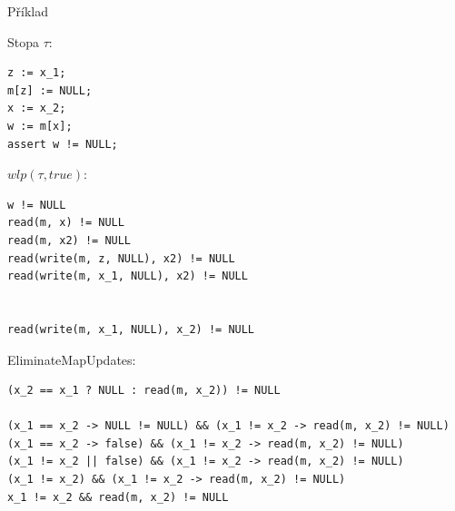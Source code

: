 \documentclass[11pt]{beamer}
\begin{document}
\begin{frame}[fragile]{Příklad}

Stopa $\tau$:
\begin{lstlisting}
z := x_1;
m[z] := NULL;
x := x_2;
w := m[x];
assert w != NULL;
\end{lstlisting}

\pause

$wlp(\tau, true)$:
\begin{lstlisting}
w != NULL
read(m, x) != NULL
read(m, x2) != NULL
read(write(m, z, NULL), x2) != NULL
read(write(m, x_1, NULL), x2) != NULL


read(write(m, x_1, NULL), x_2) != NULL
\end{lstlisting}

\pause 

EliminateMapUpdates:
\begin{lstlisting}
(x_2 == x_1 ? NULL : read(m, x_2)) != NULL

(x_1 == x_2 -> NULL != NULL) && (x_1 != x_2 -> read(m, x_2) != NULL)
(x_1 == x_2 -> false) && (x_1 != x_2 -> read(m, x_2) != NULL)
(x_1 != x_2 || false) && (x_1 != x_2 -> read(m, x_2) != NULL)
(x_1 != x_2) && (x_1 != x_2 -> read(m, x_2) != NULL)
x_1 != x_2 && read(m, x_2) != NULL
\end{lstlisting}

\end{frame}
\end{document}
